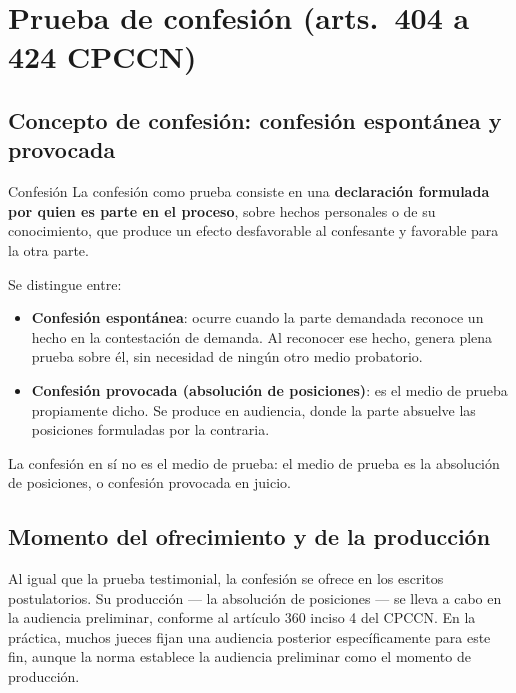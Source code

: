 \documentclass[12pt,oneside]{book}
\begin{document}
\chapter[Prueba de confesión]{Prueba de confesión (arts.~404 a 424 CPCCN)}\label{cap:confesion}


\section{Concepto de confesión: confesión espontánea y provocada}

\begin{definition}{Confesión}
La confesión como prueba consiste en una \textbf{declaración formulada por quien es parte en el proceso}, sobre hechos personales o de su conocimiento, que produce un efecto desfavorable al confesante y favorable para la otra parte.
\end{definition}

Se distingue entre:
\begin{itemize}
    \item \textbf{Confesión espontánea}: ocurre cuando la parte demandada reconoce un hecho en la contestación de demanda. Al reconocer ese hecho, genera plena prueba sobre él, sin necesidad de ningún otro medio probatorio.
    \item \textbf{Confesión provocada (absolución de posiciones)}: es el medio de prueba propiamente dicho. Se produce en audiencia, donde la parte absuelve las posiciones formuladas por la contraria.
\end{itemize}

La confesión en sí no es el medio de prueba: el medio de prueba es la absolución de posiciones, o confesión provocada en juicio.

\section{Momento del ofrecimiento y de la producción}

Al igual que la prueba testimonial, la confesión se ofrece en los escritos postulatorios. Su producción --- la absolución de posiciones --- se lleva a cabo en la audiencia preliminar, conforme al artículo 360 inciso 4 del CPCCN. En la práctica, muchos jueces fijan una audiencia posterior específicamente para este fin, aunque la norma establece la audiencia preliminar como el momento de producción.
\end{document}
